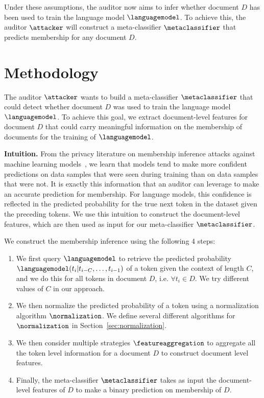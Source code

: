 \documentclass[twocolumn,10pt]{article}
\begin{document}
Under these assumptions, the auditor now aims to infer whether document $D$ has been used to train the language model $\languagemodel$. To achieve this, the auditor $\attacker$ will construct a meta-classifier $\metaclassifier$ that predicts membership for any document $D$. 
 \label{sec:auditor_model}


\section{Methodology}
The auditor $\attacker$ wants to build a meta-classifier $\metaclassifier$ that could detect whether document $D$ was used to train the language model $\languagemodel$. To achieve this goal, we extract document-level features for document $D$ that could carry meaningful information on the membership of documents for the training of $\languagemodel$. 

\textbf{Intuition.} From the privacy literature on membership inference attacks against machine learning models~\cite{shokri2017membership,feldman2020does,yeom2018privacy}, we learn that models tend to make more confident predictions on data samples that were seen during training than on data samples that were not. It is exactly this information that an auditor can leverage to make an accurate prediction for membership. For language models, this confidence is reflected in the predicted probability for the true next token in the dataset given the preceding tokens. We use this intuition to construct the document-level features, which are then used as input for our meta-classifier $\metaclassifier$.

We construct the membership inference using the following 4 steps: 

\begin{enumerate}
    \item We first query $\languagemodel$ to retrieve the predicted probability $\languagemodel(t_i | t_{i-C}, \ldots, t_{i-1})$ of a token given the context of length $C$, and we do this for all tokens in document $D$, i.e. $\forall t_i \in D$. We try different values of $C$ in our approach.
    \item We then normalize the predicted probability of a token using a normalization algorithm $\normalization$. We define several different algorithms for $\normalization$ in Section~\ref{sec:normalization}.
    \item We then consider multiple strategies $\featureaggregation$ to aggregate all the token level information for a document $D$ to construct document level features. 
    \item Finally, the meta-classifier $\metaclassifier$ takes as input the document-level features of $D$ to make a binary prediction on membership of $D$. 
\end{enumerate}
\end{document}
